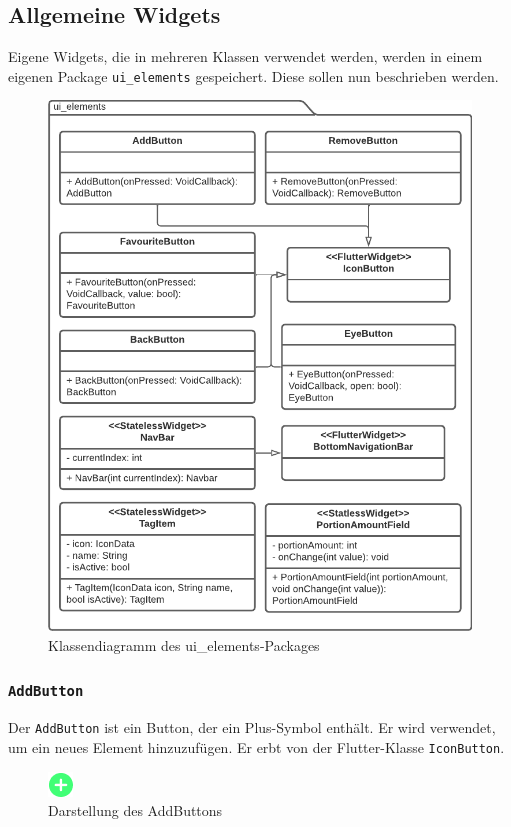 \documentclass{entwurfsheft}
\begin{document}
\begin{sloppypar}
\subsection{Allgemeine Widgets}
Eigene Widgets, die in mehreren Klassen verwendet werden, werden in einem eigenen Package \texttt{ui\_elements} gespeichert. Diese sollen nun beschrieben werden.
\begin{figure}[htp]
    \centering
    \includegraphics[height = .5\textheight]{images/presentationLayer/classDiagrams/uiElementsWhole.pdf}
    \caption{Klassendiagramm des ui\_elements-Packages}
    \label{fig:ui-elements}
\end{figure}

\subsubsection{\texttt{AddButton}}
\label{sec:addButton}
Der \texttt{AddButton} ist ein Button, der ein Plus-Symbol enthält. Er wird verwendet, um ein neues Element hinzuzufügen. Er erbt von der Flutter-Klasse \texttt{IconButton}.
\begin{figure}[htp]
    \centering
    \includegraphics[height = .5cm]{images/presentationLayer/uiElements/addButton.png}
    \caption{Darstellung des AddButtons}
\end{figure}

\end{sloppypar}
\end{document}
